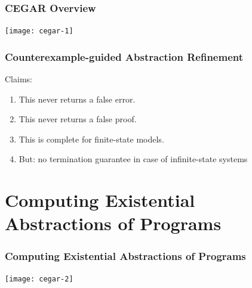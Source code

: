 
\begin{frame}
\frametitle{CEGAR Overview}

\begin{center}
\texttt{[image: cegar-1]}
\end{center}

\end{frame}


\begin{frame}
\frametitle{Counterexample-guided Abstraction Refinement}

Claims:

\begin{enumerate}
\item This never returns a false error.
\item This never returns a false proof.
\vfill
\item This is complete for finite-state models.
\item But: no termination guarantee in case of infinite-state systems
\end{enumerate}

\end{frame}


\section{Computing Existential Abstractions of Programs}

\begin{frame}
\frametitle{Computing Existential Abstractions of Programs}

\begin{center}
\texttt{[image: cegar-2]}
\end{center}

\end{frame}

